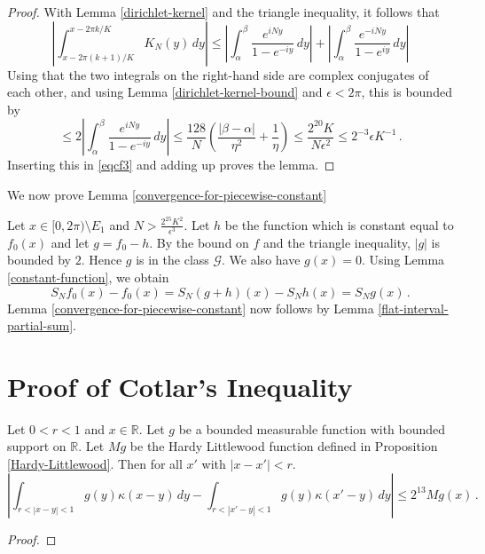 {\begin{proof}
With Lemma \ref{dirichlet-kernel} and the triangle inequality,
it follows that
\begin{equation}
   \left|\int_{x-2\pi (k+1)/K}^{x-2\pi k/K} K_N(y)\, dy\right|
   \le \left|\int_{\alpha}^{\beta}
   \frac{e^{iNy}}{1-e^{-iy}}\, dy\right|+
   \left|\int_{\alpha}^{\beta}
   \frac{e^{-iNy}}{1-e^{iy}}\, dy\right|
\end{equation}
Using that the two integrals on the right-hand side are complex conjugates of each other, and using Lemma \ref{dirichlet-kernel-bound} and $\epsilon <2\pi$, this is bounded by
\begin{equation}
   \le 2\left|\int_{\alpha}^{\beta}
   \frac{e^{iNy}}{1-e^{-iy}}\, dy\right|
   \le \frac{128}N(\frac{|\beta-\alpha|}{\eta^2}+\frac 1{\eta})
   \le \frac{2^{20}K}{N\epsilon^2 }\le 2^{-3}\epsilon K^{-1}\, .
\end{equation}
Inserting this in \eqref{eqcf3} and adding up proves
the lemma.
\end{proof}

We now prove  Lemma \ref{convergence-for-piecewise-constant}

Let $x\in [0,2\pi)\setminus E_1 $ and $N>\frac {2^{25} K^2}{\epsilon ^3}$.
Let $h$ be the function which is constant equal to $f_0(x)$ and let $g=f_0-h$.
By the bound on $f$ and the triangle inequality,
$|g|$ is bounded by $2$. Hence $g$ is in the class $\mathcal{G}$. We also have $g(x)=0$.
Using Lemma \ref{constant-function}, we obtain
\begin{equation}
    S_Nf_0(x)- f_0(x)=S_N(g+h)(x)- S_Nh(x)=S_Ng(x)\, .
\end{equation}
Lemma \ref{convergence-for-piecewise-constant}
now follows by Lemma \ref{flat-interval-partial-sum}.

\section{Proof of Cotlar's Inequality}
\label{subsec-cotlar}




\begin{lemma}
\label{control-x-shift}
Let $0<r<1$ and  $x\in \mathbb{R}$. Let $g$ be a bounded measurable function with bounded support on $\mathbb{R}$. Let $Mg$ be the Hardy Littlewood function
defined in Proposition
\ref{Hardy-Littlewood}.
Then for all $x'$ with $|x-x'|<r$.
\begin{equation}\label{xx'difference}
\left|\int_{r<|x-y|<1}
g(y) \kappa(x-y)\, dy
-\int_{r<|x'-y|<1}
g(y) \kappa(x'-y)\, dy
\right|\le 2^{13}Mg(x)\, .
\end{equation}
\end{lemma}
\begin{proof}


\end{proof}}
